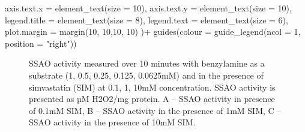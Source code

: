 \documentclass[
  letterpaper,
  DIV=11,
  numbers=noendperiod]{scrreprt}
\newenvironment{Shaded}{\begin{snugshade}}{\end{snugshade}}
\newcommand{\AttributeTok}[1]{\textcolor[rgb]{0.40,0.45,0.13}{#1}}
\newcommand{\DecValTok}[1]{\textcolor[rgb]{0.68,0.00,0.00}{#1}}
\newcommand{\FunctionTok}[1]{\textcolor[rgb]{0.28,0.35,0.67}{#1}}
\newcommand{\NormalTok}[1]{\textcolor[rgb]{0.00,0.23,0.31}{#1}}
\newcommand{\SpecialCharTok}[1]{\textcolor[rgb]{0.37,0.37,0.37}{#1}}
\newcommand{\StringTok}[1]{\textcolor[rgb]{0.13,0.47,0.30}{#1}}
\begin{document}
\begin{Shaded}
\begin{Highlighting}[]
    \AttributeTok{axis.text.x =} \FunctionTok{element\_text}\NormalTok{(}\AttributeTok{size =} \DecValTok{10}\NormalTok{),}
    \AttributeTok{axis.text.y =} \FunctionTok{element\_text}\NormalTok{(}\AttributeTok{size =} \DecValTok{10}\NormalTok{),}
    \AttributeTok{legend.title =} \FunctionTok{element\_text}\NormalTok{(}\AttributeTok{size =} \DecValTok{8}\NormalTok{),}
    \AttributeTok{legend.text =} \FunctionTok{element\_text}\NormalTok{(}\AttributeTok{size =} \DecValTok{6}\NormalTok{),}
    \AttributeTok{plot.margin =} \FunctionTok{margin}\NormalTok{(}\DecValTok{10}\NormalTok{, }\DecValTok{10}\NormalTok{,}\DecValTok{10}\NormalTok{, }\DecValTok{10}\NormalTok{)}
\NormalTok{  )}\SpecialCharTok{+}
  \FunctionTok{guides}\NormalTok{(}\AttributeTok{colour =} \FunctionTok{guide\_legend}\NormalTok{(}\AttributeTok{ncol =} \DecValTok{1}\NormalTok{, }\AttributeTok{position =} \StringTok{"right"}\NormalTok{))}
\end{Highlighting}
\end{Shaded}

\begin{figure}[H]


\caption{\label{fig-ssao-sim-activity}SSAO activity measured over 10
minutes with benzylamine as a substrate (1, 0.5, 0.25, 0.125, 0.0625mM)
and in the presence of simvastatin (SIM) at 0.1, 1, 10mM concentration.
SSAO activity is presented as µM H2O2/mg protein. A -- SSAO activity in
presence of 0.1mM SIM, B -- SSAO activity in the presence of 1mM SIM, C
-- SSAO activity in the presence of 10mM SIM.}

\end{figure}%
\end{document}
